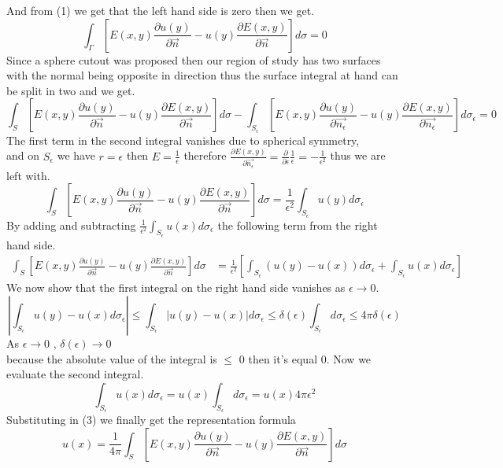 \documentclass[]{article}
\begin{document}
And from (1) we get that the left hand side is zero then we get.
\[
    \int_\Gamma \left[E(x,y)\frac{\partial u(y)}{\partial \vec{n}}-u(y)\frac{\partial E(x,y)}{\partial \vec{n}}\right] d\sigma = 0    
\]
Since a sphere cutout was proposed then our region of study has two surfaces with the normal being opposite in direction thus the surface integral at hand can be split in two and we get.
\[
    \int_S \left[E(x,y)\frac{\partial u(y)}{\partial \vec{n}}-u(y)\frac{\partial E(x,y)}{\partial \vec{n}}\right] d\sigma - \int_{S_\epsilon} \left[E(x,y)\frac{\partial u(y)}{\partial \vec{n_\epsilon}}-u(y)\frac{\partial E(x,y)}{\partial \vec{n_\epsilon}}\right] d\sigma_\epsilon  = 0    
\]
The first term in the second integral vanishes due to spherical symmetry, 
\\and on $S_\epsilon$ we have $r=\epsilon$ then $E = \frac{1}{\epsilon}$ therefore $\displaystyle \frac{\partial E(x,y)}{\partial \vec{n_\epsilon}} = \frac{\partial}{\partial \epsilon}\frac{1}{\epsilon} = -\frac{1}{\epsilon^2}$
thus we are left with.
\[
    \int_S \left[E(x,y)\frac{\partial u(y)}{\partial \vec{n}}-u(y)\frac{\partial E(x,y)}{\partial \vec{n}}\right] d\sigma  = \frac{1}{\epsilon^2} \int_{S_\epsilon} u(y) d\sigma_\epsilon    
\]
By adding and subtracting $\displaystyle \frac{1}{\epsilon^2} \int_{S_\epsilon} u(x) d\sigma_\epsilon$ the following term from the right hand side.
\begin{align}
\int_S \left[E(x,y)\frac{\partial u(y)}{\partial \vec{n}}-u(y)\frac{\partial E(x,y)}{\partial \vec{n}}\right] d\sigma  &= \frac{1}{\epsilon^2} \left[\int_{S_\epsilon} (u(y) - u(x)) d\sigma_\epsilon + \int_{S_\epsilon} u(x) d\sigma_\epsilon\right]
\end{align}
We now show that the first integral on the right hand side vanishes as $\epsilon \to 0$.
\[
    \left|\int_{S_\epsilon} u(y)-u(x) d\sigma_\epsilon \right| \leq \int_{S_\epsilon} |u(y)-u(x)| d\sigma_\epsilon \leq \delta(\epsilon)\int_{S_\epsilon} d\sigma_\epsilon \leq 4\pi \delta(\epsilon)    
\]
As $\epsilon \to 0$ , $\delta(\epsilon) \to 0$
\\because the absolute value of the integral is $\leq$ 0 then it's equal 0. Now we evaluate the second integral.
\[
    \int_{S_\epsilon} u(x)d\sigma_\epsilon = u(x)\int_{S_\epsilon}d\sigma_\epsilon = u(x) 4\pi\epsilon^2
\]
Substituting in (3) we finally get the representation formula
\[
    u(x) = \frac{1}{4\pi} \int_S \left[E(x,y)\frac{\partial u(y)}{\partial \vec{n}}-u(y)\frac{\partial E(x,y)}{\partial \vec{n}}\right] d\sigma    
\]
\end{document}
